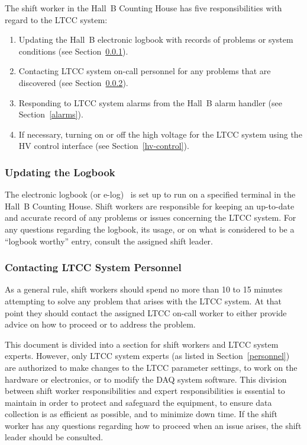 \documentclass{article}
\begin{document}
The shift worker in the Hall~B Counting House has five responsibilities with regard to the LTCC
system:

\begin{enumerate}
\item Updating the Hall~B electronic logbook with records of problems or system conditions (see 
Section~\ref{logbook}).

\item Contacting LTCC system on-call personnel for any problems that are discovered (see 
Section~\ref{contact}).

\item Responding to LTCC system alarms from the Hall~B alarm handler (see Section~\ref{alarms}).

\item If necessary, turning on or off the high voltage for the LTCC system using the HV control interface (see 
Section~\ref{hv-control}).

\end{enumerate}

\subsubsection{Updating the Logbook}
\label{logbook}

The electronic logbook (or e-log)~\cite{e-log} is set up to run on a specified terminal in the 
Hall~B Counting House. Shift workers are responsible for keeping an up-to-date and accurate record
of any problems or issues concerning the LTCC system. For any questions regarding the logbook, its
usage, or on what is considered to be a ``logbook worthy'' entry, consult the assigned shift leader.

\subsubsection{Contacting LTCC System Personnel}
\label{contact}

As a general rule, shift workers should spend no more than 10 to 15 minutes attempting to solve
any problem that arises with the LTCC system. At that point they should contact the assigned 
LTCC on-call worker to either provide advice on how to proceed or to address the problem.

This document is divided into a section for shift workers and LTCC system experts. However, only 
LTCC system experts (as listed in Section~\ref{personnel}) are authorized to make changes to the 
LTCC parameter settings, to work on the hardware or electronics, or to modify the DAQ system 
software. This division between shift worker responsibilities and expert responsibilities is
essential to maintain in order to protect and safeguard the equipment, to ensure data collection
is as efficient as possible, and to minimize down time. If the shift worker has any questions 
regarding how to proceed when an issue arises, the shift leader should be consulted.
\end{document}
